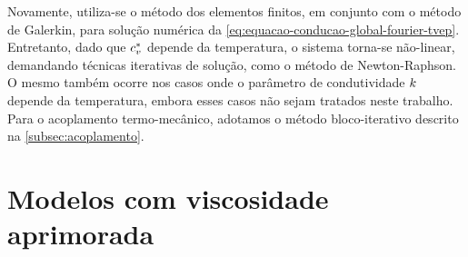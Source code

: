 \documentclass[Tese.tex]{subfiles}
\begin{document}
Novamente, utiliza-se o método dos elementos finitos, em conjunto com o método de Galerkin, para solução numérica da \cref{eq:equacao-conducao-global-fourier-tvep}. Entretanto, dado que $c_v^{*}$ depende da temperatura, o sistema torna-se não-linear, demandando técnicas iterativas de solução, como o método de Newton-Raphson. O mesmo também ocorre nos casos onde o parâmetro de condutividade $k$ depende da temperatura, embora esses casos não sejam tratados neste trabalho. Para o acoplamento termo-mecânico, adotamos o método bloco-iterativo descrito na \cref{subsec:acoplamento}.

%

%

\section{Modelos com viscosidade aprimorada}
\end{document}

